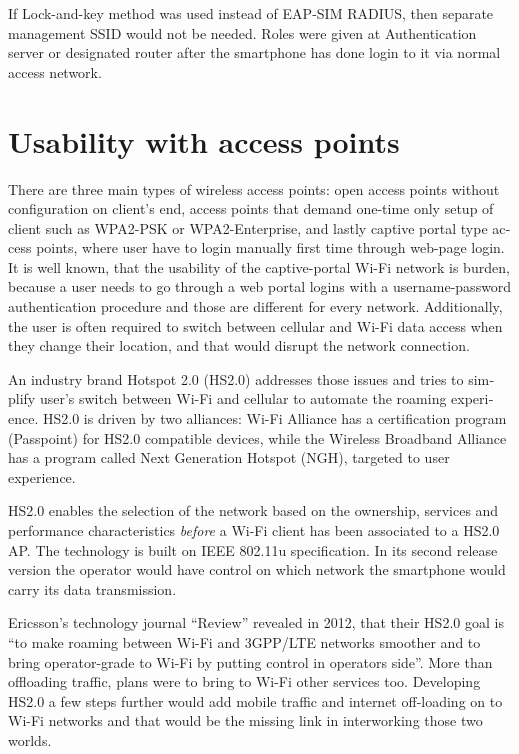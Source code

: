 \documentclass[12pt,a4paper,english]{tutthesis}
\begin{document}
\begin{otherlanguage}{english}
If Lock-and-key method was used instead of EAP-SIM RADIUS, then
separate manage\-ment SSID would not be needed. Roles were given at
Authentication server or designated router after the smartphone has done login to it
via normal access network.


\section{Usability with access points}
\label{sec-6-4}
There are three main types of wireless access points: open access
points without configuration on client's end, access points that
demand one-time only setup of client such as WPA2-PSK or
WPA2-Enterprise, and lastly captive portal type access points, where
user have to login manually first time through web-page login.
It is well known, that the usability of the captive-portal Wi-Fi
 network is burden, because a user needs to go through 
a web portal logins with a username-password authentication 
procedure and those are different for every network.
Additionally, the user is often required to switch 
between cellular and  Wi-Fi data access when they change their
 location, and that would disrupt the network connection.

An industry brand  Hotspot 2.0 (HS2.0) addresses those issues and tries to
simplify user's switch between Wi-Fi and cellular to automate the
roaming experience.  HS2.0 is driven by two alliances:
Wi-Fi Alliance has a certification program (Passpoint)
for HS2.0 compatible devices, while the Wireless Broadband
Alliance has a program called Next Generation Hotspot (NGH), targeted
to user experience\cite{wba-ngh}.

HS2.0
enables the selection of the network based on the ownership, services and
performance characteristics \emph{before} a Wi-Fi client has been associated
to a HS2.0 AP. The technology is built on IEEE 802.11u specification. 
In its second release version the operator would
have control on which network the smartphone would carry its data
transmission. 





Ericsson's technology journal ``Review'' revealed in 2012, that their 
HS2.0 goal is ``to make roaming between Wi-Fi and 3GPP/LTE networks smoother
and to bring operator-grade to Wi-Fi by putting control in operators side''. More
than offloading traffic, plans were to bring to Wi-Fi other services too\cite{er-seamless}.
Developing HS2.0 a few steps further would add mobile traffic and internet
off-loading on to Wi-Fi networks and that would be the missing link in
interworking those two worlds.




\end{otherlanguage}
\end{document}
